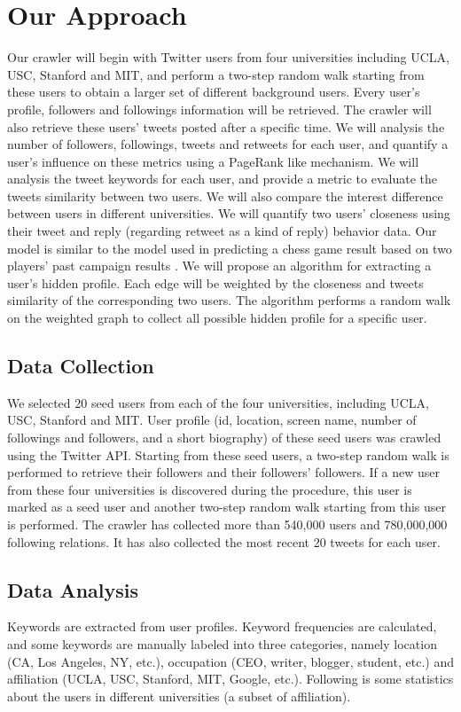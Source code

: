 \section{Our Approach}\label{sec:method}

Our crawler will begin with Twitter users from four universities including UCLA, USC, Stanford and MIT, and perform a two-step random walk starting from these users to obtain a larger set of different background users. Every user's profile, followers and followings information will be retrieved. The crawler will also retrieve these users' tweets posted after a specific time.
We will analysis the number of followers, followings, tweets and retweets for each user, and quantify a user's influence on these metrics using a PageRank like mechanism.
We will analysis the tweet keywords for each user, and provide a metric to evaluate the tweets similarity between two users. We will also compare the interest difference between users in different universities.
We will quantify two users' closeness using their tweet and reply (regarding retweet as a kind of reply) behavior data. Our model is similar to the model used in predicting a chess game result based on two players' past campaign results \cite{elo1986rating}.
We will propose an algorithm for extracting a user's hidden profile. Each edge will be weighted by the closeness and tweets similarity of the corresponding two users. The algorithm performs a random walk on the weighted graph to collect all possible hidden profile for a specific user.



\subsection{Data Collection}
We selected 20 seed users from each of the four universities, including UCLA, USC, Stanford and MIT. User profile (id, location, screen name, number of followings and followers, and a short biography) of these seed users was crawled using the Twitter API. Starting from these seed users, a two-step random walk is performed to retrieve their followers and their followers' followers. If a new user from these four universities is discovered during the procedure, this user is marked as a seed user and another two-step random walk starting from this user is performed. The crawler has collected more than 540,000 users and 780,000,000 following relations. It has also collected the most recent 20 tweets for each user.

\subsection{Data Analysis}
Keywords are extracted from user profiles. Keyword frequencies are calculated, and some keywords are manually labeled into three categories, namely location (CA, Los Angeles, NY, etc.), occupation (CEO, writer, blogger, student, etc.) and affiliation (UCLA, USC, Stanford, MIT, Google, etc.). Following is some statistics about the users in different universities (a subset of affiliation).

